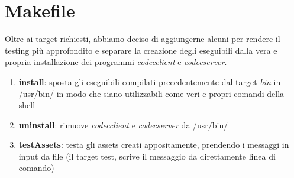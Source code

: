 \documentclass[a4paper,9pt]{article}
\begin{document}
\section{Makefile}
Oltre ai target richiesti, abbiamo deciso di aggiungerne alcuni per rendere il testing più approfondito e separare la creazione degli eseguibili dalla vera e propria installazione dei programmi \emph{codecclient} e \emph{codecserver}.
\begin{enumerate}
\item \textbf{install}: sposta gli eseguibili compilati precedentemente dal target \emph{bin} in /usr/bin/ in modo che siano utilizzabili come veri e propri comandi della shell
\item \textbf{uninstall}: rimuove \emph{codecclient} e \emph{codecserver} da /usr/bin/
\item \textbf{testAssets}: testa gli assets creati appositamente, prendendo i messaggi in input da file (il target test, scrive il messaggio da direttamente linea di comando)
\end{enumerate} 
\end{document}
